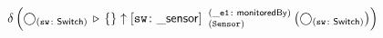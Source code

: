 \documentclass[varwidth=100cm,convert={density=120}]{standalone}
\begin{document}
\begin{preview}
$\duplicateelimination \left(\getvertices{sw}{Switch} \antijoin \{\} \expandout{sw}{\_sensor}{Sensor}{\_e1}{monitoredBy} \left(\getvertices{sw}{Switch}\right)\right)$
\end{preview}
\end{document}
